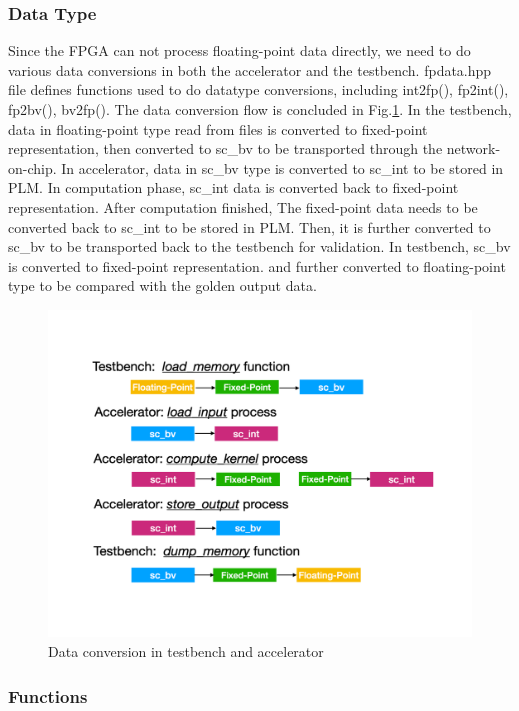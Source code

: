 \subsubsection{Data Type}

Since the FPGA can not process floating-point data directly, we need to do
various data conversions in both the accelerator and the testbench. fpdata.hpp
file defines functions used to do datatype conversions, including int2fp(),
fp2int(), fp2bv(), bv2fp(). The data conversion flow is concluded in
Fig.\ref{fig:data-convert}. In the testbench, data in floating-point type read
from files is converted to fixed-point representation, then converted to sc\_bv
to be transported through the network-on-chip. In accelerator, data in sc\_bv
type is converted to sc\_int to be stored in PLM. In computation phase, sc\_int
data is converted back to fixed-point representation. After computation
finished, The fixed-point data needs to be converted back to sc\_int to be
stored in PLM. Then, it is further converted to sc\_bv to be transported back to
the testbench for validation. In testbench, sc\_bv is converted to fixed-point
representation. and further converted to floating-point type to be compared with
the golden output data. \\

\begin{figure}[t]
\centering
\captionsetup{justification=centering, format=hang}
\includegraphics[width=0.85\columnwidth]{figures/data-conversion}
\caption{Data conversion in testbench and accelerator}
\label{fig:data-convert}
\end{figure}



\subsubsection{Functions}

